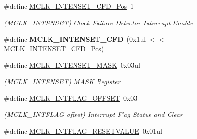 \begin{DoxyCompactItemize}
\item 
\hypertarget{group___s_a_m_l21___m_c_l_k_gad24fe2d7974fdcfcde7c1785b78fc8d9}{}\#define \hyperlink{group___s_a_m_l21___m_c_l_k_gad24fe2d7974fdcfcde7c1785b78fc8d9}{M\+C\+L\+K\+\_\+\+I\+N\+T\+E\+N\+S\+E\+T\+\_\+\+C\+F\+D\+\_\+\+Pos}~1\label{group___s_a_m_l21___m_c_l_k_gad24fe2d7974fdcfcde7c1785b78fc8d9}

\begin{DoxyCompactList}\small\item\em (M\+C\+L\+K\+\_\+\+I\+N\+T\+E\+N\+S\+E\+T) Clock Failure Detector Interrupt Enable \end{DoxyCompactList}\item 
\hypertarget{group___s_a_m_l21___m_c_l_k_ga5ab0ffbb565548e969b535ff30f72eda}{}\#define {\bfseries M\+C\+L\+K\+\_\+\+I\+N\+T\+E\+N\+S\+E\+T\+\_\+\+C\+F\+D}~(0x1ul $<$$<$ M\+C\+L\+K\+\_\+\+I\+N\+T\+E\+N\+S\+E\+T\+\_\+\+C\+F\+D\+\_\+\+Pos)\label{group___s_a_m_l21___m_c_l_k_ga5ab0ffbb565548e969b535ff30f72eda}

\item 
\hypertarget{group___s_a_m_l21___m_c_l_k_gaa5b62ad35b9bc2c164fea2457115e2b8}{}\#define \hyperlink{group___s_a_m_l21___m_c_l_k_gaa5b62ad35b9bc2c164fea2457115e2b8}{M\+C\+L\+K\+\_\+\+I\+N\+T\+E\+N\+S\+E\+T\+\_\+\+M\+A\+S\+K}~0x03ul\label{group___s_a_m_l21___m_c_l_k_gaa5b62ad35b9bc2c164fea2457115e2b8}

\begin{DoxyCompactList}\small\item\em (M\+C\+L\+K\+\_\+\+I\+N\+T\+E\+N\+S\+E\+T) M\+A\+S\+K Register \end{DoxyCompactList}\item 
\hypertarget{group___s_a_m_l21___m_c_l_k_gaf56eeb6ada43fe94d261d6d04336635b}{}\#define \hyperlink{group___s_a_m_l21___m_c_l_k_gaf56eeb6ada43fe94d261d6d04336635b}{M\+C\+L\+K\+\_\+\+I\+N\+T\+F\+L\+A\+G\+\_\+\+O\+F\+F\+S\+E\+T}~0x03\label{group___s_a_m_l21___m_c_l_k_gaf56eeb6ada43fe94d261d6d04336635b}

\begin{DoxyCompactList}\small\item\em (M\+C\+L\+K\+\_\+\+I\+N\+T\+F\+L\+A\+G offset) Interrupt Flag Status and Clear \end{DoxyCompactList}\item 
\hypertarget{group___s_a_m_l21___m_c_l_k_ga8e5308a9ba8280b0e4f121e9d65a36a4}{}\#define \hyperlink{group___s_a_m_l21___m_c_l_k_ga8e5308a9ba8280b0e4f121e9d65a36a4}{M\+C\+L\+K\+\_\+\+I\+N\+T\+F\+L\+A\+G\+\_\+\+R\+E\+S\+E\+T\+V\+A\+L\+U\+E}~0x01ul\label{group___s_a_m_l21___m_c_l_k_ga8e5308a9ba8280b0e4f121e9d65a36a4}


\end{DoxyCompactItemize}
